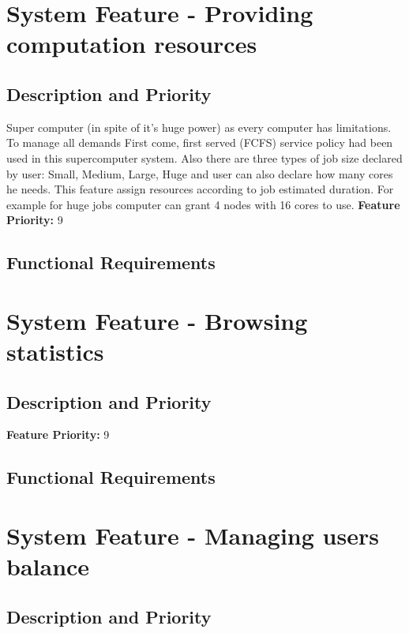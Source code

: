 \documentclass{scrreprt}
\begin{document}
\section{System Feature - Providing computation resources  }

\subsection{Description and Priority}
Super computer (in spite of it's huge power) as every computer has limitations.
To manage all demands First come, first served  (FCFS) service policy had been used in this supercomputer system. Also there are three types of job size declared by user: Small, Medium, Large, Huge and user can also declare how many cores he needs. This feature assign resources according to job estimated duration. For example for huge jobs computer can grant 4 nodes with 16 cores to use.
\textbf{Feature Priority: } 9

\subsection{Functional Requirements}




\section{System Feature - Browsing statistics  }

\subsection{Description and Priority}

\textbf{Feature Priority: } 9

\subsection{Functional Requirements}




\section{System Feature - Managing users balance   }

\subsection{Description and Priority}
\end{document}
